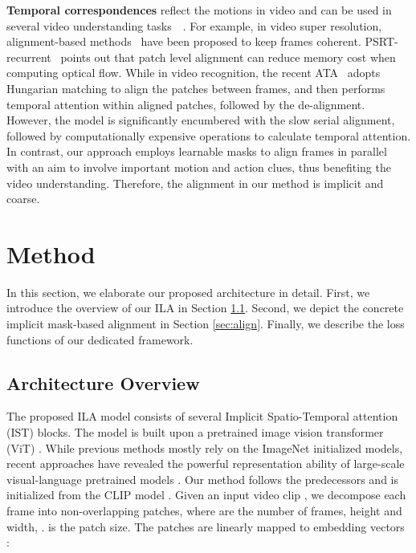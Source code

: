 \documentclass[10pt,twocolumn,letterpaper]{article}
\begin{document}
\vspace{0.05in}
\noindent \textbf{Temporal correspondences} reflect the motions in video and can be used in several video understanding tasks~~\cite{b14,b35,b36,b37,b38,b39}.
For example, in video super resolution, alignment-based methods~\cite{b40,b41,b42,b43,b44,b45} have been proposed to keep frames coherent.
PSRT-recurrent~\cite{b40} points out that patch level alignment can reduce memory cost when computing optical flow.
While in video recognition, the recent ATA~\cite{b28} adopts Hungarian matching to align the patches between frames, and then performs temporal attention within aligned patches, followed by the de-alignment.
However, the model is significantly encumbered with the slow serial alignment, followed by computationally expensive operations to calculate temporal attention. 
In contrast, our approach employs learnable masks to align frames in parallel with an aim to involve important motion and action clues, thus benefiting the video understanding. Therefore, the alignment in our method is implicit and coarse.


\section{Method}

In this section, we elaborate our proposed architecture in detail. First, we introduce the overview of our ILA in Section \ref{sec:overview}. Second, we depict the concrete implicit mask-based alignment in Section \ref{sec:align}. Finally, we describe the loss functions of our dedicated framework.

\subsection{Architecture Overview}
\label{sec:overview}

The proposed ILA model consists of several Implicit Spatio-Temporal attention (IST) blocks.
The model is built upon a pretrained image vision transformer (ViT) \cite{dosovitskiy2020image}.
While previous methods \cite{b17,b13} mostly rely on the ImageNet initialized models, recent approaches \cite{b24,b25,pan2022st,yang2023aim} have revealed the powerful representation ability of large-scale visual-language pretrained models \cite{b21,b19}.
Our method follows the predecessors and is initialized from the CLIP model \cite{b21}.
Given an input video clip , we decompose each frame into  non-overlapping patches, where  are the number of frames, height and width, .  is the patch size.
The patches are linearly mapped to embedding vectors :
\end{document}
